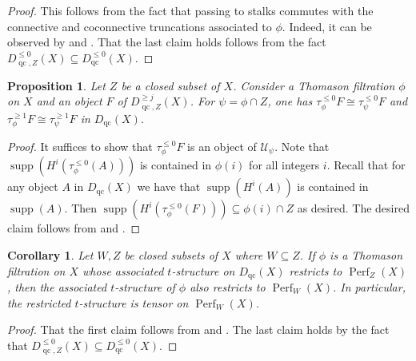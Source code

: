 \documentclass[11pt]{amsart}
\theoremstyle{plain}
\newtheorem{corollary}[theorem]{Corollary}
\newtheorem{proposition}[theorem]{Proposition}
\theoremstyle{definition}
\numberwithin{equation}{section}
\numberwithin{theorem}{section}
\begin{document}
\begin{proof}
    This follows from the fact that passing to stalks commutes with the connective and coconnective truncations associated to $\phi$. Indeed, it can be observed by \cite[Proposition 1.13]{AlonsoTarrio/JeremiasLopez/Saorin:2010} and \cite[Proposition 3.5]{Lank:2025}. That the last claim holds follows from the fact $D^{\leq 0}_{\operatorname{qc},Z}(X)\subseteq D^{\leq 0}_{\operatorname{qc}}(X)$.
\end{proof} 

\begin{proposition}\label{prop:truncations_preserve_support}
    Let $Z$ be a closed subset of $X$. Consider a Thomason filtration $\phi$ on $X$ and an object $F$ of $D^{\geq j}_{\operatorname{qc},Z}(X)$. For $\psi = \phi\cap Z$, one has $\tau^{\leq 0}_\phi F\cong \tau^{\leq 0}_\psi F$ and $\tau^{\geq 1}_\phi F\cong \tau^{\geq 1}_\psi F$ in $D_{\operatorname{qc}}(X)$.
\end{proposition}

\begin{proof}
    It suffices to show that $\tau^{\leq 0}_\phi F$ is an object of $\mathcal{U}_\psi$. Note that $\operatorname{supp}(H^i(\tau^{\leq 0}_{\phi}(A)))$ is contained in $\phi(i)$ for all integers $i$. Recall that for any object $A$ in $D_{\operatorname{qc}}(X)$ we have that $\operatorname{supp}(H^i(A))$ is contained in $\operatorname{supp}(A)$. Then $\operatorname{supp}(H^i(\tau^{\leq 0}_{\phi}(F))) \subseteq \phi (i)\cap Z$ as desired. The desired claim follows from \cite[Theorem 3.6]{Lank:2025} and \cite[Example 2.1]{Hrbek/Lank/LeGros/Pavon:2026}.
\end{proof}

\begin{corollary}\label{cor:automatic_restriction_to_smaller_Thomason}
    Let $W,Z$ be closed subsets of $X$ where $W\subseteq Z$. If $\phi$ is a Thomason filtration on $X$ whose associated $t$-structure on $D_{\operatorname{qc}}(X)$ restricts to $\operatorname{Perf}_Z(X)$, then the associated $t$-structure of $\phi$ also restricts to $\operatorname{Perf}_W(X)$. In particular, the restricted $t$-structure is tensor on $\operatorname{Perf}_W (X)$.
\end{corollary}

\begin{proof}
    That the first claim follows from  and . The last claim holds by the fact that $D^{\leq 0}_{\operatorname{qc},Z}(X)\subseteq D^{\leq 0}_{\operatorname{qc}}(X)$.
\end{proof}
\end{document}
